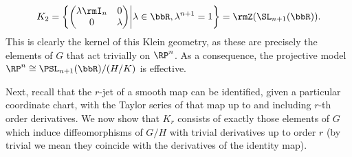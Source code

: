 \begin{example}
    \[K_2=\left\{ 
        \begin{pmatrix}
            \lambda \rmI_n & 0 \\
            0 & \lambda
        \end{pmatrix} \middle| \lambda\in\bbR, \lambda^{n+1}=1
    \right\}=\rmZ(\SL_{n+1}(\bbR)).\]
    This is clearly the kernel of this Klein geometry, as these are precisely the elements of $G$ that act trivially on $\RP^n$. As a consequence, the projective model $\RP^n\cong \PSL_{n+1}(\bbR)\slash (H\slash K)$ is effective.
\end{example}


Next, recall that the $r$-jet of a smooth map can be identified, given a particular coordinate chart, with the Taylor series of that map up to and including $r$-th order derivatives. We now show that $K_r$ consists of exactly those elements of $G$ which induce diffeomorphisms of $G\slash H$ with trivial derivatives up to order $r$ (by trivial we mean they coincide with the derivatives of the identity map).

